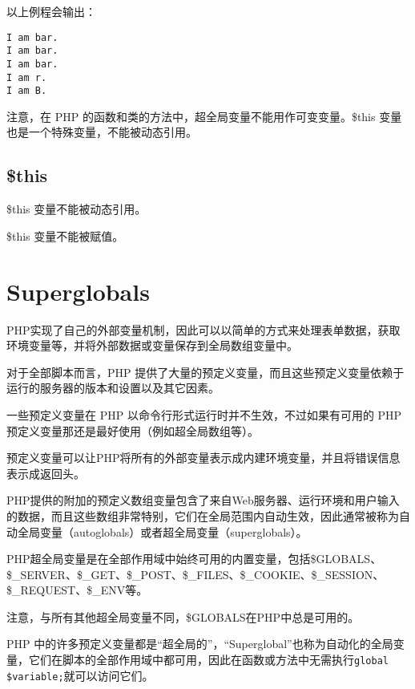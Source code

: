 以上例程会输出：

\begin{verbatim}
I am bar.
I am bar.
I am bar.
I am r.
I am B.
\end{verbatim}

注意，在 PHP 的函数和类的方法中，超全局变量不能用作可变变量。\$this 变量也是一个特殊变量，不能被动态引用。

\section{\$this}

\begin{compactitem}
\item \$this 变量不能被动态引用。
\item \$this 变量不能被赋值。
\end{compactitem}



\chapter{Superglobals}


PHP实现了自己的外部变量机制，因此可以以简单的方式来处理表单数据，获取环境变量等，并将外部数据或变量保存到全局数组变量中。




对于全部脚本而言，PHP 提供了大量的预定义变量，而且这些预定义变量依赖于运行的服务器的版本和设置以及其它因素。



一些预定义变量在 PHP 以命令行形式运行时并不生效，不过如果有可用的 PHP 预定义变量那还是最好使用（例如超全局数组等）。

预定义变量可以让PHP将所有的外部变量表示成内建环境变量，并且将错误信息表示成返回头。





PHP提供的附加的预定义数组变量包含了来自Web服务器、运行环境和用户输入的数据，而且这些数组非常特别，它们在全局范围内自动生效，因此通常被称为自动全局变量（autoglobals）或者超全局变量（superglobals）。



PHP超全局变量是在全部作用域中始终可用的内置变量，包括\$GLOBALS、\$\_SERVER、\$\_GET、\$\_POST、\$\_FILES、\$\_COOKIE、\$\_SESSION、\$\_REQUEST、\$\_ENV等。

注意，与所有其他超全局变量不同，\$GLOBALS在PHP中总是可用的。

PHP 中的许多预定义变量都是“超全局的”，“Superglobal”也称为自动化的全局变量，它们在脚本的全部作用域中都可用，因此在函数或方法中无需执行\texttt{global \$variable;}就可以访问它们。




